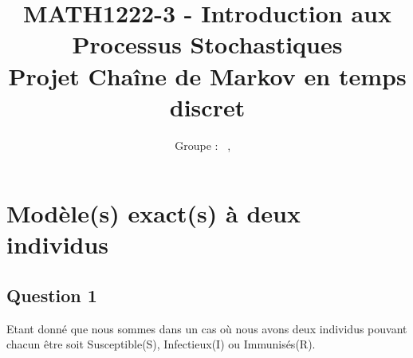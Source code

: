 \documentclass[a4paper, 11pt, oneside]{article}
\title{\textbf{MATH1222-3 - Introduction aux Processus Stochastiques}\\Projet Chaîne de Markov en temps discret}
\author{Groupe \GrNbr : \PrenomUN~\textsc{\NomUN}, \PrenomDEUX~\textsc{\NomDEUX}}
\date{}
\newcommand{\tablemat}{~}
\renewcommand{\tablemat}{\tableofcontents}
\begin{document}
\maketitle
\newpage
\tablemat
\newpage

\section{\textbf{Modèle(s) exact(s) à deux individus}}
\subsection{Question 1}

Etant donné que nous sommes dans un cas où nous avons deux individus 
pouvant chacun être soit Susceptible(S), Infectieux(I) ou Immunisés(R).
\end{document}

